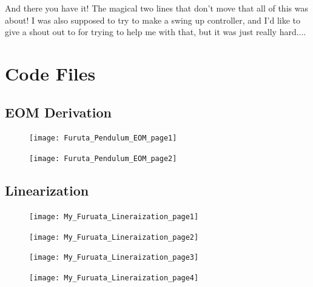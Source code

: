 \documentclass[letterpaper,10pt,oneside]{article}
\begin{document}
And there you have it! The magical two lines that don't move that all of this was about!
I was also supposed to try to make a swing up controller, and I'd like to give a shout out to \cite{SWINGUP} for trying to help me with that, but it was just really hard....


\clearpage

\appendix
\section{Code Files}

\subsection{EOM Derivation}
\label{EOM}
\begin{figure}[!h]
  \centering
  \texttt{[image: Furuta\_Pendulum\_EOM\_page1]}
\end{figure}

\begin{figure}[!h]
  \centering
  \texttt{[image: Furuta\_Pendulum\_EOM\_page2]}
\end{figure}
\clearpage

\subsection{Linearization}
\label{Code:Linearization}
\begin{figure}[!h]
  \centering
  \texttt{[image: My\_Furuata\_Lineraization\_page1]}
\end{figure}

\begin{figure}[!h]
  \centering
  \texttt{[image: My\_Furuata\_Lineraization\_page2]}
\end{figure}

\begin{figure}[!h]
  \centering
  \texttt{[image: My\_Furuata\_Lineraization\_page3]}
\end{figure}

\begin{figure}[!h]
  \centering
  \texttt{[image: My\_Furuata\_Lineraization\_page4]}
\end{figure}
\end{document}
